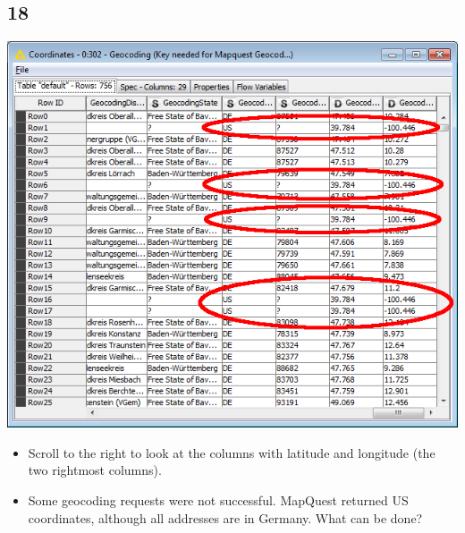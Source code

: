 \documentclass{beamer}
\begin{document}
\subsection{18}
\begin{frame}
	\begin{center}
  		\includegraphics[height=0.6\textheight]{18.png}
	\end{center}
	\begin{itemize}
		\item Scroll to the right to look at the columns with latitude and longitude (the two rightmost columns).
		\item Some geocoding requests were not successful. MapQuest returned US coordinates, although all addresses are in Germany. What can be done?
	\end{itemize}
\end{frame}
\end{document}
